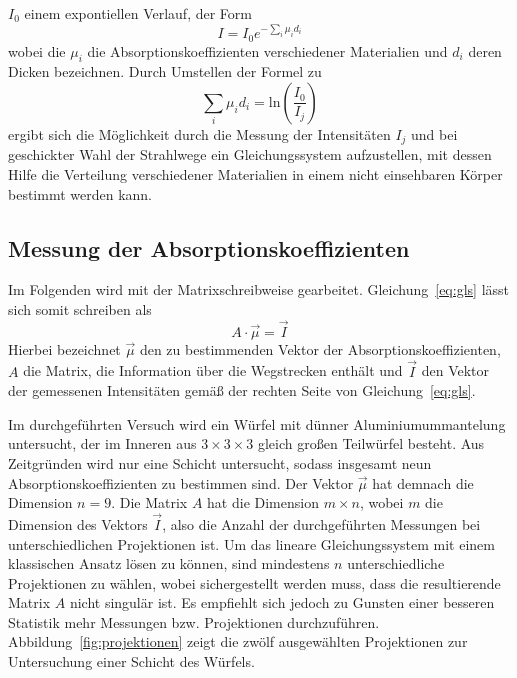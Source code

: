 $I_0$ einem expontiellen Verlauf, der Form
\begin{equation}
  I=I_0e^{-\sum_i\mu_id_i}
\end{equation}
wobei die $\mu_i$ die Absorptionskoeffizienten verschiedener Materialien und
$d_i$ deren Dicken bezeichnen. Durch Umstellen der Formel zu
\begin{equation}
  \sum_i\mu_id_i=\text{ln}\left(\frac{I_0}{I_j}\right)
  \label{eq:gls}
\end{equation}
ergibt sich die Möglichkeit durch die Messung der Intensitäten $I_j$ und bei
geschickter Wahl der Strahlwege ein Gleichungssystem aufzustellen, mit dessen
Hilfe die Verteilung verschiedener Materialien in einem nicht einsehbaren Körper
bestimmt werden kann.

\subsection{Messung der Absorptionskoeffizienten}
Im Folgenden wird mit der Matrixschreibweise gearbeitet.
Gleichung~\eqref{eq:gls} lässt sich somit schreiben als
\begin{equation}
  A\cdot\vec{\mu}=\vec{I}
  \label{eq:gls_matrix}
\end{equation}
Hierbei bezeichnet $\vec{\mu}$ den zu bestimmenden Vektor der
Absorptionskoeffizienten, $A$ die Matrix, die Information über die Wegstrecken
enthält und $\vec{I}$ den Vektor der gemessenen Intensitäten gemäß der rechten
Seite von Gleichung~\eqref{eq:gls}.

Im durchgeführten Versuch wird ein Würfel mit dünner Aluminiumummantelung
untersucht, der im Inneren aus $3\times3\times3$ gleich großen Teilwürfel
besteht. Aus Zeitgründen wird nur eine Schicht untersucht, sodass insgesamt neun
Absorptionskoeffizienten zu bestimmen sind. Der Vektor $\vec{\mu}$ hat demnach
die Dimension $n=9$. Die Matrix $A$ hat die Dimension $m\times n$, wobei $m$ die
Dimension des Vektors $\vec{I}$, also die Anzahl der durchgeführten Messungen
bei unterschiedlichen Projektionen ist. Um das lineare Gleichungssystem mit
einem klassischen Ansatz lösen zu können, sind mindestens $n$ unterschiedliche
Projektionen zu wählen, wobei sichergestellt werden muss, dass die resultierende
Matrix $A$ nicht singulär ist. Es empfiehlt sich jedoch zu Gunsten einer
besseren Statistik mehr Messungen bzw. Projektionen durchzuführen.
Abbildung~\ref{fig:projektionen} zeigt die zwölf ausgewählten Projektionen zur
Untersuchung einer Schicht des Würfels.

